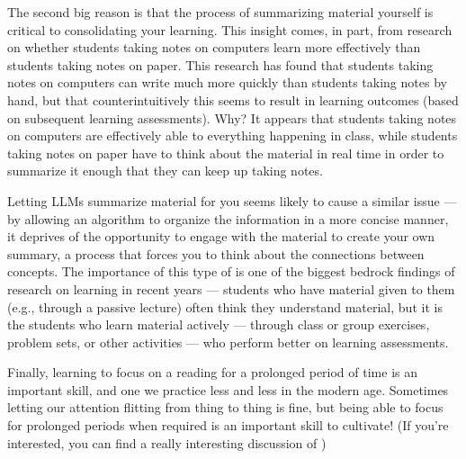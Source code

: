 \documentclass[letterpaper,10pt,english]{jupyterBook}
\begin{document}
\sphinxAtStartPar
The second big reason is that the process of summarizing material yourself is critical to consolidating your learning. This insight comes, in part, from research on whether students taking notes on computers learn more effectively than students taking notes on paper. This research has found that students taking notes on computers can write much more quickly than students taking notes by hand, but that counter\sphinxhyphen{}intuitively this seems to result in  learning outcomes (based on subsequent learning assessments). Why? It appears that students taking notes on computers are effectively able to  everything happening in class, while students taking notes on paper have to think about the material in real time in order to summarize it enough that they can keep up taking notes.

\sphinxAtStartPar
Letting LLMs summarize material for you seems likely to cause a similar issue — by allowing an algorithm to organize the information in a more concise manner, it deprives  of the opportunity to engage with the material to create your own summary, a process that forces you to  think about the connections between concepts. The importance of this type of  is one of the biggest bedrock findings of research on learning in recent years — students who have material given to them (e.g., through a passive lecture) often think they understand material, but it is the students who learn material actively — through class or group exercises, problem sets, or other activities — who perform better on learning assessments.

\sphinxAtStartPar
Finally, learning to focus on a reading for a prolonged period of time is an important skill, and one we practice less and less in the modern age. Sometimes letting our attention flitting from thing to thing is fine, but being able to focus for prolonged periods when required is an important skill to cultivate! (If you’re interested, you can find a really interesting discussion of )

\sphinxstepscope
\end{document}
